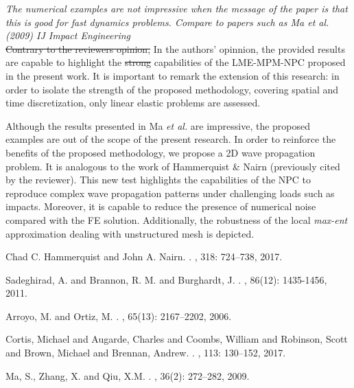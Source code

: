 \documentclass[12pt]{article}
\begin{document}
 \textit{The numerical examples are not impressive when the message of the paper is that this is good for fast dynamics problems. Compare to papers such as Ma et al. (2009) IJ Impact Engineering}\\

\sout{Contrary to the reviewer\textquotesingle s opinion,} In the authors' opinnion, the provided results are capable to highlight the \sout{strong} capabilities of the \acrshort{LME-}MPM-NPC proposed in the present work. It is important to remark the extension of this research: in order to isolate the strength of the proposed methodology, covering spatial and time discretization, only linear elastic problems are assessed. 

Although the results presented in Ma {\it et al.} \cite{MA2009272} are impressive, the proposed examples are out of the scope of the present research. In order to reinforce the benefits of the proposed methodology, we propose a 2D wave propagation problem. It is analogous to the work of Hammerquist \& Nairn \cite{HAMMERQUIST2017724} (previously cited by the reviewer). This new test highlights the capabilities of the NPC to reproduce complex wave propagation patterns under challenging loads such as impacts. Moreover, it is capable to reduce the presence of numerical noise compared with the FE solution. Additionally, the robustness of the local \textit{max-ent} approximation dealing with unstructured mesh is depicted.


\begin{thebibliography}{10}

Chad C. Hammerquist and John A. Nairn.
.
,  318: 724--738, 2017.

Sadeghirad, A. and Brannon, R. M. and Burghardt, J.
.
, 86(12): 1435-1456, 2011.

Arroyo, M. and Ortiz, M.
.
,  65(13): 2167--2202, 2006.

Cortis, Michael and Augarde, Charles and Coombs, William and Robinson, Scott and Brown, Michael and Brennan, Andrew.
.
, 113: 130--152, 2017.

Ma, S., Zhang, X.  and  Qiu, X.M.
.
, 36(2): 272--282, 2009.

\end{thebibliography}
\end{document}
